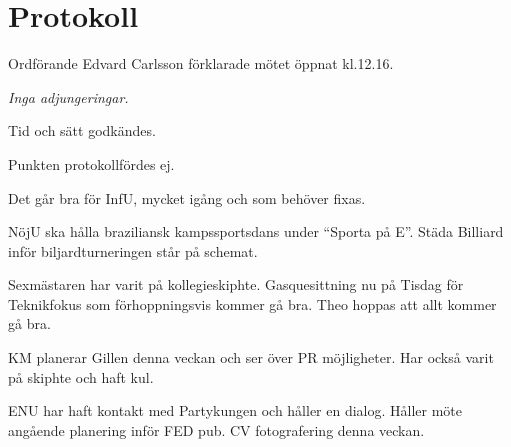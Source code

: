 \documentclass[10pt]{article}
\def\mo{Edvard Carlsson}
\begin{document}
\section*{Protokoll}
\begin{paragrafer}
Ordförande {\mo} förklarade mötet öppnat kl.12.16.

{\valavmo}

{\valavms}

{\valavj}

{\tosg}

\textit{Inga adjungeringar.}


Tid och sätt godkändes.





\begin{fyllnadsval} %


\end{fyllnadsval}

\begin{paragrafer}
Punkten protokollfördes ej.

Det går bra för InfU, mycket igång och som behöver fixas. 

NöjU ska hålla braziliansk kampssportsdans under ``Sporta på E''. Städa Billiard inför biljardturneringen står på schemat.

Sexmästaren har varit på kollegieskiphte. Gasquesittning nu på Tisdag för Teknikfokus som förhoppningsvis kommer gå bra. Theo hoppas att allt kommer gå bra.

KM planerar Gillen denna veckan och ser över PR möjligheter. Har också varit på skiphte och haft kul.

ENU har haft kontakt med Partykungen och håller en dialog. Håller möte angående planering inför FED pub. CV fotografering denna veckan.


\end{paragrafer}
\end{paragrafer}
\end{document}
